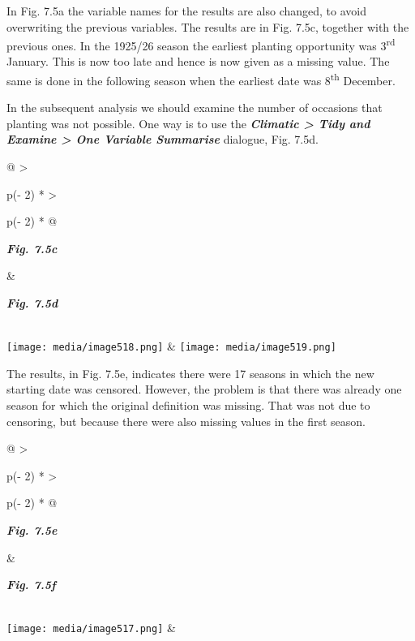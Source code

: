 \documentclass[
  letterpaper,
  DIV=11,
  numbers=noendperiod]{scrreprt}
\begin{document}
In Fig. 7.5a the variable names for the results are also changed, to
avoid overwriting the previous variables. The results are in Fig. 7.5c,
together with the previous ones. In the 1925/26 season the earliest
planting opportunity was 3\textsuperscript{rd} January. This is now too
late and hence is now given as a missing value. The same is done in the
following season when the earliest date was 8\textsuperscript{th}
December.

In the subsequent analysis we should examine the number of occasions
that planting was not possible. One way is to use the
\textbf{\emph{Climatic \textgreater{} Tidy and Examine \textgreater{}
One Variable Summarise}} dialogue, Fig. 7.5d.

\begin{longtable}[]{@{}
  >{\raggedright\arraybackslash}p{(\columnwidth - 2\tabcolsep) * }
  >{\raggedright\arraybackslash}p{(\columnwidth - 2\tabcolsep) * }@{}}
\toprule\noalign{}
\begin{minipage}[b]{\linewidth}\raggedright
\textbf{\emph{Fig. 7.5c}}
\end{minipage} & \begin{minipage}[b]{\linewidth}\raggedright
\textbf{\emph{Fig. 7.5d}}
\end{minipage} \\
\midrule\noalign{}
\endhead
\bottomrule\noalign{}
\endlastfoot
\texttt{[image: media/image518.png]} &
\texttt{[image: media/image519.png]} \\
\end{longtable}

The results, in Fig. 7.5e, indicates there were 17 seasons in which the
new starting date was censored. However, the problem is that there was
already one season for which the original definition was missing. That
was not due to censoring, but because there were also missing values in
the first season.

\begin{longtable}[]{@{}
  >{\raggedright\arraybackslash}p{(\columnwidth - 2\tabcolsep) * }
  >{\raggedright\arraybackslash}p{(\columnwidth - 2\tabcolsep) * }@{}}
\toprule\noalign{}
\begin{minipage}[b]{\linewidth}\raggedright
\textbf{\emph{Fig. 7.5e}}
\end{minipage} & \begin{minipage}[b]{\linewidth}\raggedright
\textbf{\emph{Fig. 7.5f}}
\end{minipage} \\
\midrule\noalign{}
\endhead
\bottomrule\noalign{}
\endlastfoot
\texttt{[image: media/image517.png]}
& \\
\end{longtable}
\end{document}
